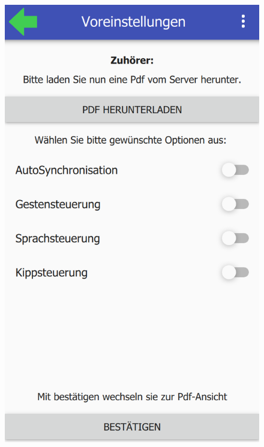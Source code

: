 \begin{figure}[ht!]
	\centering
	\begin{minipage}{0.31\linewidth}
		\centering
		\includegraphics[scale=0.5]{GUI/Bilder/7_H_Voreinstellungen.PNG}
	\end{minipage}
	\begin{minipage}{0.31\linewidth}
		\centering

\end{minipage}
\end{figure}

